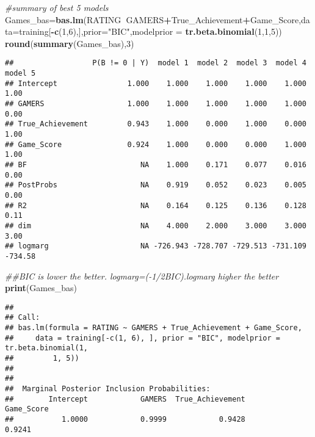 \documentclass[
]{article}
\newenvironment{Shaded}{\begin{snugshade}}{\end{snugshade}}
\newcommand{\CommentTok}[1]{\textcolor[rgb]{0.56,0.35,0.01}{\textit{#1}}}
\newcommand{\DataTypeTok}[1]{\textcolor[rgb]{0.13,0.29,0.53}{#1}}
\newcommand{\DecValTok}[1]{\textcolor[rgb]{0.00,0.00,0.81}{#1}}
\newcommand{\KeywordTok}[1]{\textcolor[rgb]{0.13,0.29,0.53}{\textbf{#1}}}
\newcommand{\NormalTok}[1]{#1}
\newcommand{\OperatorTok}[1]{\textcolor[rgb]{0.81,0.36,0.00}{\textbf{#1}}}
\newcommand{\StringTok}[1]{\textcolor[rgb]{0.31,0.60,0.02}{#1}}
\begin{document}
\begin{Shaded}
\begin{Highlighting}[]
\CommentTok{#summary of best 5 models}
\NormalTok{Games_bas=}\KeywordTok{bas.lm}\NormalTok{(RATING}\OperatorTok{~}\NormalTok{GAMERS}\OperatorTok{+}\NormalTok{True_Achievement}\OperatorTok{+}\NormalTok{Game_Score,}\DataTypeTok{data=}\NormalTok{training[}\OperatorTok{-}\KeywordTok{c}\NormalTok{(}\DecValTok{1}\NormalTok{,}\DecValTok{6}\NormalTok{),],}\DataTypeTok{prior=}\StringTok{"BIC"}\NormalTok{,}\DataTypeTok{modelprior =} \KeywordTok{tr.beta.binomial}\NormalTok{(}\DecValTok{1}\NormalTok{,}\DecValTok{1}\NormalTok{,}\DecValTok{5}\NormalTok{))}
\KeywordTok{round}\NormalTok{(}\KeywordTok{summary}\NormalTok{(Games_bas),}\DecValTok{3}\NormalTok{)}
\end{Highlighting}
\end{Shaded}

\begin{verbatim}
##                  P(B != 0 | Y)  model 1  model 2  model 3  model 4 model 5
## Intercept                1.000    1.000    1.000    1.000    1.000    1.00
## GAMERS                   1.000    1.000    1.000    1.000    1.000    0.00
## True_Achievement         0.943    1.000    0.000    1.000    0.000    1.00
## Game_Score               0.924    1.000    0.000    0.000    1.000    1.00
## BF                          NA    1.000    0.171    0.077    0.016    0.00
## PostProbs                   NA    0.919    0.052    0.023    0.005    0.00
## R2                          NA    0.164    0.125    0.136    0.128    0.11
## dim                         NA    4.000    2.000    3.000    3.000    3.00
## logmarg                     NA -726.943 -728.707 -729.513 -731.109 -734.58
\end{verbatim}

\begin{Shaded}
\begin{Highlighting}[]
\CommentTok{##BIC is lower the better. logmarg=(-1/2BIC).logmarg higher the better}
\KeywordTok{print}\NormalTok{(Games_bas)}
\end{Highlighting}
\end{Shaded}

\begin{verbatim}
## 
## Call:
## bas.lm(formula = RATING ~ GAMERS + True_Achievement + Game_Score, 
##     data = training[-c(1, 6), ], prior = "BIC", modelprior = tr.beta.binomial(1, 
##         1, 5))
## 
## 
##  Marginal Posterior Inclusion Probabilities: 
##        Intercept            GAMERS  True_Achievement        Game_Score  
##           1.0000            0.9999            0.9428            0.9241
\end{verbatim}
\end{document}
